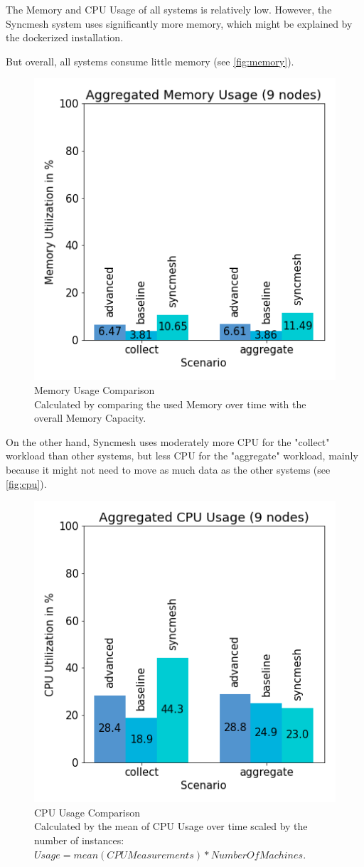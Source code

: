\documentclass[conference]{IEEEtran}
\begin{document}
The Memory and CPU Usage of all systems is relatively low. 
However, the Syncmesh system uses significantly more memory, which might be explained by the dockerized installation. 

But overall, all systems consume little memory (see \autoref{fig:memory}).

\begin{figure}[!h]
	\centering
		\includegraphics[width=0.7\linewidth]{img/ram_comparison_aggregated_9.png}
	\caption{Memory Usage Comparison\\ Calculated by comparing the used Memory over time with the overall Memory Capacity.}
    \label{fig:memory}
\end{figure}

On the other hand, Syncmesh uses moderately more CPU for the "collect" workload than other systems, but less CPU for the "aggregate" workload, mainly because it might not need to move as much data as the other systems (see \autoref{fig:cpu}). 

\begin{figure}[!h]
	\centering
		\includegraphics[width=0.7\linewidth]{img/cpu_comparison_aggregated_9.png}
	\caption{CPU Usage Comparison\\
	Calculated by the mean of CPU Usage over time scaled by the number of instances: \\ 
	$ Usage = mean(CPU Measurements) * Number Of Machines$.}
    \label{fig:cpu}
\end{figure}
\end{document}
